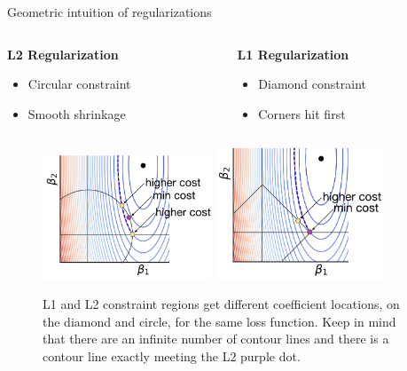 \begin{frame}{Geometric intuition of regularizations}
    \begin{columns}
        \begin{column}{0.5\textwidth}
            \textbf{L2 Regularization}
            \begin{itemize}
                \item Circular constraint
                \item Smooth shrinkage
            \end{itemize}
        \end{column}
        \begin{column}{0.5\textwidth}
            \textbf{L1 Regularization}
            \begin{itemize}
                \item Diamond constraint
                \item Corners hit first
            \end{itemize}
        \end{column}
    \end{columns}

    \vspace{1em}

    \begin{figure}
        \centering
        \includegraphics[width=0.45\textwidth]{images/L2contour.png}
        \hspace{1em}
        \includegraphics[width=0.45\textwidth]{images/L1contour.png}
        \caption{L1 and L2 constraint regions get different coefficient locations, on the diamond and circle, for the same loss function. Keep in mind that there are an infinite number of contour lines and there is a contour line exactly meeting the L2 purple dot.}
    \end{figure}
\end{frame}

